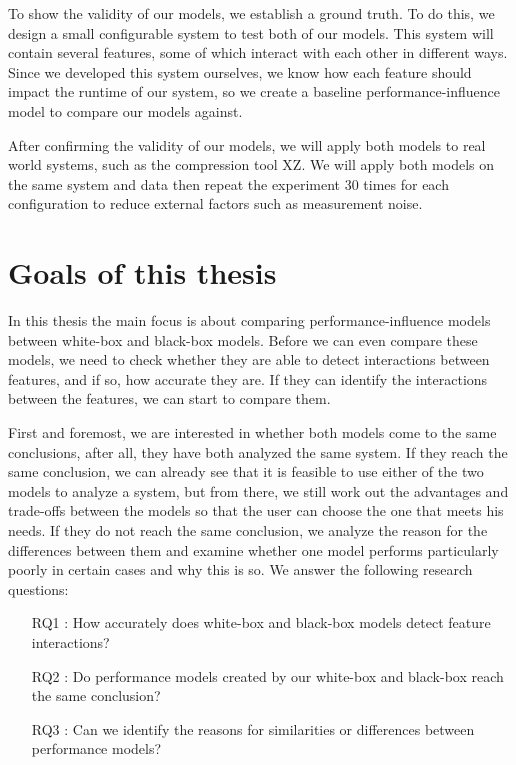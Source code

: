 To show the validity of our models, we establish a ground truth. To do this, we design a small configurable system to test both of our 
models. This system will contain several features, some of which interact with each other in different ways. 
Since we developed this system ourselves, we know how each feature should impact the runtime of our system, so we create
a baseline performance-influence model to compare our models against.

After confirming the validity of our models, we will apply both models to real world systems, such as the compression tool
XZ. We will apply both models on the same system and data then repeat the experiment 30 times for each configuration to reduce external
factors such as measurement noise.

\section{Goals of this thesis}
In this thesis the main focus is about comparing performance-influence models between white-box and black-box models. 
Before we can even compare these models, we need to check whether they are able to detect interactions between features, 
and if so, how accurate they are. If they can identify the interactions between the features, we can start to compare them. 

First and foremost, we are interested in whether both models come to the same conclusions, after all, they have both analyzed the same system. 
If they reach the same conclusion, we can already see that it is feasible to use either of the two models to analyze a system, 
but from there, we still work out the advantages and trade-offs between the models so that the user can choose the one that meets 
his needs. If they do not reach the same conclusion, we analyze the reason for the differences between them and examine whether one model 
performs particularly poorly in certain cases and why this is so. We answer the following research questions:

\begin{itemize}
\item[RQ1]: How accurately does white-box and black-box models detect feature interactions? 
\item[RQ2]: Do performance models created by our white-box and black-box reach the same conclusion?
\item[RQ3]: Can we identify the reasons for similarities or differences between performance models?
\end{itemize}
